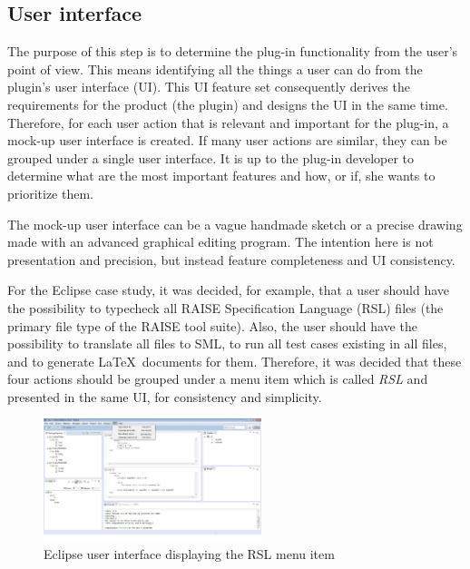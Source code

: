 \documentclass[conference]{IEEEtran}
\begin{document}
%
\subsection{User interface}
\label{sec:user-interface}

The purpose of this step is to determine the plug-in functionality from the
user's point of view. This means identifying all the things a user can
do from the plugin's user interface (UI). This UI feature set
consequently derives the requirements for the product (the plugin) and
designs the UI in the same time. Therefore, for each user action that
is relevant and important for the plug-in, a mock-up user interface is
created. If many user actions are similar, they can be grouped under a
single user interface. It is up to the plug-in developer to determine
what are the most important features and how, or if, she wants to
prioritize them.

The mock-up user interface can be a vague handmade sketch or a
precise drawing made with an advanced graphical editing program.  The
intention here is not presentation and precision, but instead feature
completeness and UI consistency.

For the Eclipse case study, it was decided, for example, that a user
should have the possibility to typecheck all RAISE Specification
Language (RSL) files (the primary file type of the RAISE tool suite).
Also, the user should have the possibility to translate all files to
SML, to run all test cases existing in all files, and to generate
\LaTeX\ documents for them.  Therefore, it was decided that these four
actions should be grouped under a menu item which is called \emph{RSL}
and presented in the same UI, for consistency and simplicity.  

\begin{figure}[!t] \centering
\includegraphics[width=2.5in]{RSLMenu.jpeg} 
\caption{Eclipse user interface displaying the RSL menu item} 
\label{UIMenu} 
\end{figure}
\end{document}
